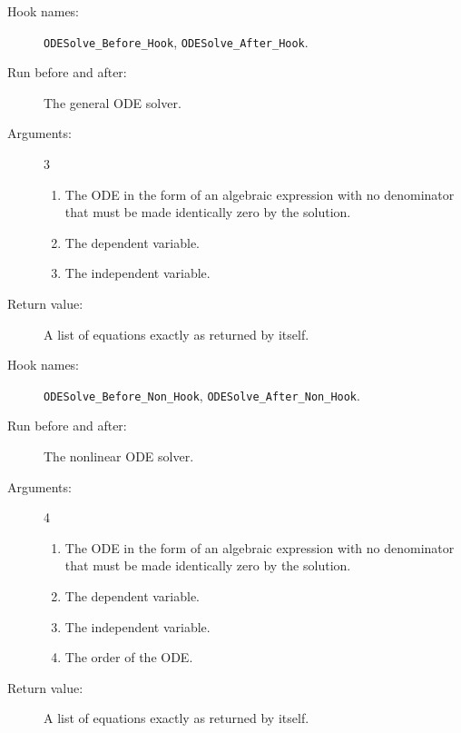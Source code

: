 \noindent\hrulefill

\begin{description}
\item[Hook names:] \texttt{ODESolve\_Before\_Hook},
\texttt{ODESolve\_After\_Hook}.
\item[Run before and after:] The general ODE solver.
\item[Arguments:] 3
\begin{enumerate}
\item The ODE in the form of an algebraic expression with no
denominator that must be made identically zero by the solution.
\item The dependent variable.
\item The independent variable.
\end{enumerate}
\item[Return value:] A list of equations exactly as returned by
 itself.
\end{description}

\noindent\hrulefill

\begin{description}
\item[Hook names:] \texttt{ODESolve\_Before\_Non\_Hook},
\texttt{ODESolve\_After\_Non\_Hook}.
\item[Run before and after:] The nonlinear ODE solver.
\item[Arguments:] 4
\begin{enumerate}
\item The ODE in the form of an algebraic expression with no
denominator that must be made identically zero by the solution.
\item The dependent variable.
\item The independent variable.
\item The order of the ODE.
\end{enumerate}
\item[Return value:] A list of equations exactly as returned by
 itself.
\end{description}

\noindent\hrulefill
\pagebreak

